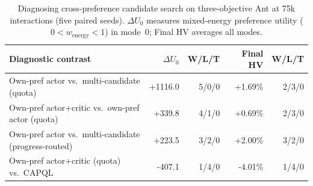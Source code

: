 \begin{table}[!htbp]
\centering\small\setlength{\tabcolsep}{4.5pt}
\caption{Diagnosing cross-preference candidate search on three-objective Ant at 75k interactions (five paired seeds). $\Delta U_0$ measures mixed-energy preference utility ($0 < w_{\mathrm{energy}} < 1$) in mode~0; Final HV averages all modes.}
\label{tab:ant_search}
\begin{tabular}{@{}lrrrr@{}}
\toprule
Diagnostic contrast & $\Delta U_0$ & W/L/T & Final HV & W/L/T \\
\midrule
Own-pref actor vs.\ multi-candidate (quota) & +1116.0 & 5/0/0 & +1.69\% & 2/3/0 \\
Own-pref actor+critic vs.\ own-pref actor (quota) & +339.8 & 4/1/0 & +0.69\% & 2/3/0 \\
Own-pref actor vs.\ multi-candidate (progress-routed) & +223.5 & 3/2/0 & +2.00\% & 3/2/0 \\
Own-pref actor+critic (quota) vs.\ CAPQL & -407.1 & 1/4/0 & -4.01\% & 1/4/0 \\
\bottomrule
\end{tabular}
\end{table}
